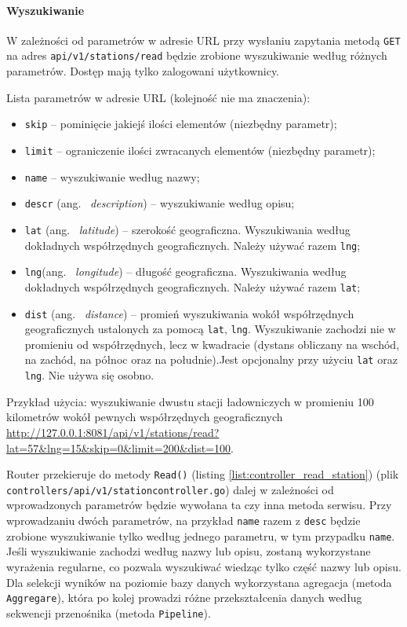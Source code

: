 \paragraph{Wyszukiwanie\newline}
W zależności od parametrów w adresie URL przy wysłaniu zapytania metodą \texttt{GET} na adres \texttt{api/v1/stations/read} będzie zrobione wyszukiwanie według różnych parametrów.
Dostęp mają tylko zalogowani użytkownicy.

Lista parametrów w adresie URL (kolejność nie ma znaczenia):
\begin{itemize}
    \item \texttt{skip} -- pominięcie jakiejś ilości elementów (niezbędny parametr);
    \item \texttt{limit} -- ograniczenie ilości zwracanych elementów (niezbędny parametr);
    \item \texttt{name} -- wyszukiwanie według nazwy;
    \item \texttt{descr} (ang. ~\emph{description}) -- wyszukiwanie według opisu;
    \item \texttt{lat} (ang. ~\emph{latitude}) -- szerokość geograficzna. Wyszukiwania według dokładnych współrzędnych geograficznych. Należy używać razem \texttt{lng};
    \item \texttt{lng}(ang. ~\emph{longitude}) -- długość geograficzna. Wyszukiwania według dokładnych współrzędnych geograficznych. Należy używać razem \texttt{lat};
    \item \texttt{dist} (ang. ~\emph{distance}) -- promień wyszukiwania wokół współrzędnych geograficznych ustalonych za pomocą \texttt{lat}, \texttt{lng}. Wyszukiwanie zachodzi nie w promieniu od współrzędnych, lecz w kwadracie (dystans obliczany na wschód, na zachód, na północ oraz na południe).Jest opcjonalny przy użyciu \texttt{lat} oraz \texttt{lng}. Nie używa się osobno.
\end{itemize}

Przykład użycia: wyszukiwanie dwustu stacji ładowniczych w promieniu 100 kilometrów wokół pewnych współrzędnych geograficznych \url{http://127.0.0.1:8081/api/v1/stations/read?lat=57&lng=15&skip=0&limit=200&dist=100}.

Router przekieruje do metody \texttt{Read()} (listing \ref{list:controller_read_station}) (plik \texttt{controllers/api/v1/stationcontroller.go}) dalej w zależności od wprowadzonych parametrów będzie wywołana ta czy inna metoda serwisu.
Przy wprowadzaniu dwóch parametrów, na przykład \texttt{name} razem z \texttt{desc} będzie zrobione wyszukiwanie tylko według jednego parametru, w tym przypadku \texttt{name}. Jeśli wyszukiwanie zachodzi według nazwy lub opisu, zostaną wykorzystane wyrażenia regularne, co pozwala wyszukiwać wiedząc tylko część nazwy lub opisu.
Dla selekcji wyników na poziomie bazy danych wykorzystana agregacja (metoda \texttt{Aggregare}), która po kolej prowadzi różne przekształcenia danych według sekwencji przenośnika (metoda \texttt{Pipeline}).

